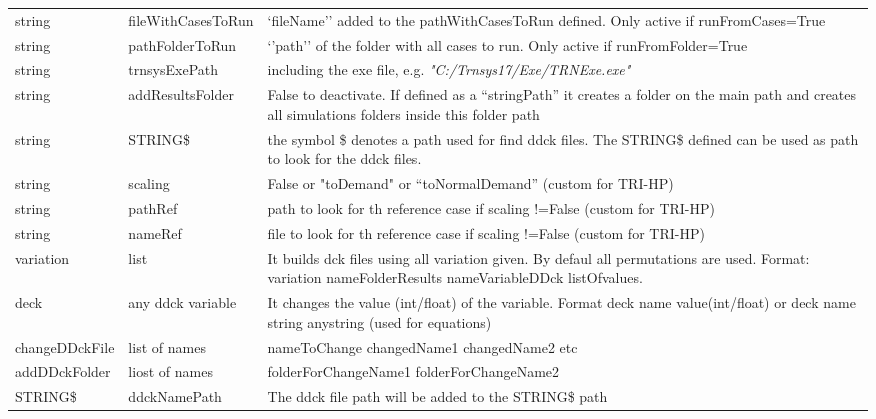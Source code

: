 \documentclass[english]{SPFReport}
\begin{document}
\begin{tabular}{| p{25mm} |  p{35mm} | p{90mm}  |}
string & fileWithCasesToRun & `fileName'' added to the pathWithCasesToRun defined. Only active if runFromCases=True \\
string & pathFolderToRun & `'path'' of the folder with all cases to run. Only active if runFromFolder=True \\
 string & trnsysExePath & including the exe file, e.g. \textit{"C:/Trnsys17/Exe/TRNExe.exe"} \\
 string & addResultsFolder & False to deactivate. If defined as a ``stringPath'' it creates a folder on the main path and creates all simulations folders inside this folder path\\
  string & STRING\$ & the symbol \$ denotes a path used for find ddck files. The STRING\$ defined can be used as path to look for the ddck files.\\
 string & scaling & False or "toDemand" or ``toNormalDemand'' (custom for TRI-HP) \\
string &pathRef & path to look for th reference case if scaling !=False (custom for TRI-HP)  \\
string &nameRef & file to look for th reference case if scaling !=False  (custom for TRI-HP) \\

  variation & list & It builds dck files using all variation given.  By defaul all permutations are used. Format: variation nameFolderResults nameVariableDDck listOfvalues.\\
    deck & any ddck variable & It changes the value (int/float) of the variable. Format deck name value(int/float) or deck name string anystring (used for equations) \\
    
changeDDckFile & list of names &  nameToChange changedName1 changedName2 etc \\
addDDckFolder & liost of names &  folderForChangeName1 folderForChangeName2 \\

   STRING\$ & ddckNamePath & The ddck file path will be added to the STRING\$ path \\   
\hline
\end{tabular}
\end{document}
